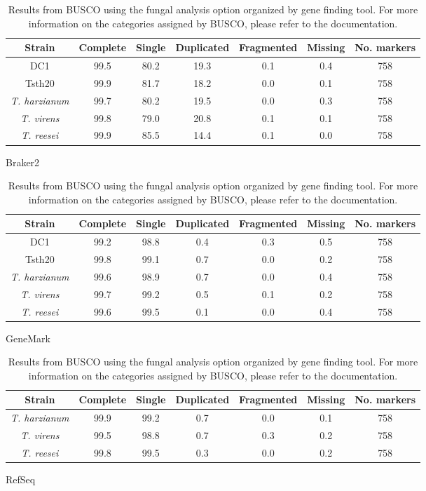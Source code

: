 \begin{table}
  \begin{center}
    \begin{subtable}{\textwidth}
      \centering
      \begin{tabular}{|c|c|c|c|c|c|c|}
        \hline
        Strain & Complete & Single & Duplicated & Fragmented & Missing & No. markers \\ \hline
        DC1 & 99.5 & 80.2 & 19.3 & 0.1 & 0.4 & 758 \\ \hline
        Tsth20 & 99.9 & 81.7 & 18.2 & 0.0 & 0.1 & 758 \\ \hline
        \textit{T. harzianum} & 99.7 & 80.2 & 19.5 & 0.0 & 0.3 & 758 \\ \hline
        \textit{T. virens} & 99.8 & 79.0 & 20.8 & 0.1 & 0.1 & 758 \\ \hline
        \textit{T. reesei} & 99.9 & 85.5 & 14.4 & 0.1 & 0.0 & 758 \\ \hline
      \end{tabular}
      \caption{Braker2}
    \end{subtable}
    \begin{subtable}{\textwidth}
      \centering
      \begin{tabular}{|c|c|c|c|c|c|c|}
        \hline
        Strain & Complete & Single & Duplicated & Fragmented & Missing & No. markers \\ \hline
        DC1 & 99.2 & 98.8 & 0.4 & 0.3 & 0.5 & 758 \\ \hline
        Tsth20 & 99.8 & 99.1 & 0.7 & 0.0 & 0.2 & 758 \\ \hline
        \textit{T. harzianum} & 99.6 & 98.9 & 0.7 & 0.0 & 0.4 & 758 \\ \hline
        \textit{T. virens} & 99.7 & 99.2 & 0.5 & 0.1 & 0.2 & 758 \\ \hline
        \textit{T. reesei} & 99.6 & 99.5 & 0.1 & 0.0 & 0.4 & 758 \\ \hline
      \end{tabular}
      \caption{GeneMark}
    \end{subtable}
    \begin{subtable}{\textwidth}
      \centering
      \begin{tabular}{|c|c|c|c|c|c|c|}
        \hline
        Strain & Complete & Single & Duplicated & Fragmented & Missing & No. markers \\ \hline
        \textit{T. harzianum} & 99.9 & 99.2 & 0.7 & 0.0 & 0.1 & 758 \\ \hline
        \textit{T. virens} & 99.5 & 98.8 & 0.7 & 0.3 & 0.2 & 758 \\ \hline
        \textit{T. reesei} & 99.8 & 99.5 & 0.3 & 0.0 & 0.2 & 758 \\ \hline
      \end{tabular}
      \caption{RefSeq}
    \end{subtable}
  \end{center}
  \caption{Results from BUSCO using the fungal analysis option
    organized by gene finding tool. For more information on the
    categories assigned by BUSCO, please refer to the documentation.}
  \label{table:busco}
\end{table}

